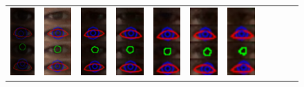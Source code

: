 \begin{figure}
	\centering
	\begin{tabular}{|c|c|c|c|c|c|c|c|c|c|c|} 
		\hline 
		\includegraphics[width=0.07\linewidth]{img_Versuch_Auge/Auge_2}&
		\includegraphics[width=0.07\linewidth]{img_Versuch_Auge/Auge_3}&
		\includegraphics[width=0.07\linewidth]{img_Versuch_Auge/Auge_6}&
		\includegraphics[width=0.07\linewidth]{img_Versuch_Auge/Auge_7}&
		\includegraphics[width=0.07\linewidth]{img_Versuch_Auge/Auge_10}&
		\includegraphics[width=0.07\linewidth]{img_Versuch_Auge/Auge_11}&	
		\includegraphics[width=0.07\linewidth]{img_Versuch_Auge/Auge_14}&

\end{tabular}
\end{figure}
